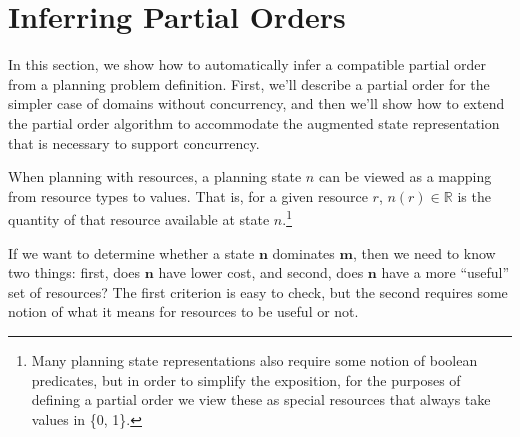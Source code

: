 \documentclass[letterpaper]{article}
\theoremstyle{plain} \newtheorem{theorem}{Theorem} \newtheorem{proposition}{Proposition} \newtheorem{lemma}{Lemma}
\theoremstyle{definition} \newtheorem{definition}{Definition} \newtheorem{conjecture}{Conjecture} \newtheorem*{example}{Example}
\theoremstyle{remark} \newtheorem*{remark}{Remark} \newtheorem*{note}{Note} \newtheorem{case}{Case}
\newcommand{\R}{\mathbb{R}}
\begin{document}
\section{Inferring Partial Orders}

\newcommand{\po}{\preceq_R}

In this section, we show how to automatically infer a compatible partial order from a
planning problem definition. First, we'll describe a partial order for the simpler case of
domains without concurrency, and then we'll show how to extend the partial order algorithm
to accommodate the augmented state representation that is necessary to support concurrency.

When planning with resources, a planning state $n$ can be viewed as a mapping from resource
types to values. That is, for a given resource $r$, $n(r) \in \R$ is the quantity of that
resource available at state $n$.\footnote{Many planning state representations also require
some notion of boolean predicates, but in order to simplify the exposition, for the
purposes of defining a partial order we view these as special resources that always take
values in \{0, 1\}.}

If we want to determine whether a state $\mathbf{n}$ dominates $\mathbf{m}$, then we need
to know two things: first, does $\mathbf{n}$ have lower cost, and second, does $\mathbf{n}$
have a more ``useful'' set of resources? The first criterion is easy to check, but the
second requires some notion of what it means for resources to be useful or not.
\end{document}
